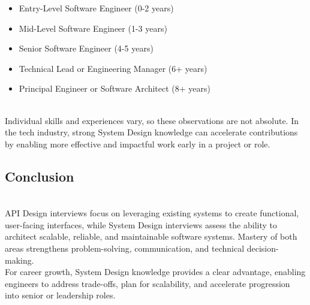 \begin{itemize}
\item
\protect{}\label{-J3qqsWC81J8wWnScMrO3}
Entry-Level Software Engineer (0-2 years)
\item
\protect{}\label{FGuCGJ2ngLKJt4bsKYxb7}
Mid-Level Software Engineer (1-3 years)
\item
\protect{}\label{l-xxpepcNS05_rLLqLyCF}
Senior Software Engineer (4-5 years)
\item
\protect{}\label{vmNuDahK3uuBtEzAG659q}
Technical Lead or Engineering Manager (6+ years)
\item
\protect{}\label{AjKQvdZ-B3tz2083sT0B9}
Principal Engineer or Software Architect (8+ years)
\end{itemize}
\\
Individual skills and experiences vary, so these observations are not absolute. In the tech industry, strong System Design knowledge can accelerate contributions by enabling more effective and impactful work early in a project or role.

\subsection{Conclusion}\label{D6KqGA8jLJsqxvm8Vtb5K}
\\
API Design interviews focus on leveraging existing systems to create functional, user-facing interfaces, while System Design interviews assess the ability to architect scalable, reliable, and maintainable software systems. Mastery of both areas strengthens problem-solving, communication, and technical decision-making.
\\
For career growth, System Design knowledge provides a clear advantage, enabling engineers to address trade-offs, plan for scalability, and accelerate progression into senior or leadership roles.

